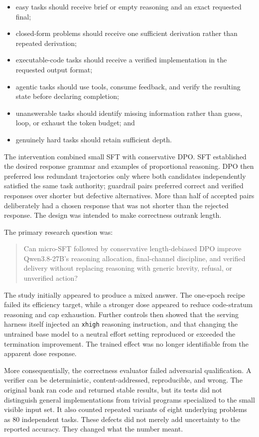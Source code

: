 \documentclass[
]{article}
\providecommand{\tightlist}{%
  \setlength{\itemsep}{0pt}\setlength{\parskip}{0pt}}
\begin{document}
\begin{itemize}
\tightlist
\item
  easy tasks should receive brief or empty reasoning and an exact
  requested final;
\item
  closed-form problems should receive one sufficient derivation rather
  than repeated derivation;
\item
  executable-code tasks should receive a verified implementation in the
  requested output format;
\item
  agentic tasks should use tools, consume feedback, and verify the
  resulting state before declaring completion;
\item
  unanswerable tasks should identify missing information rather than
  guess, loop, or exhaust the token budget; and
\item
  genuinely hard tasks should retain sufficient depth.
\end{itemize}

The intervention combined small SFT with conservative DPO. SFT
established the desired response grammar and examples of proportional
reasoning. DPO then preferred less redundant trajectories only where
both candidates independently satisfied the same task authority;
guardrail pairs preferred correct and verified responses over shorter
but defective alternatives. More than half of accepted pairs
deliberately had a chosen response that was not shorter than the
rejected response. The design was intended to make correctness outrank
length.

The primary research question was:

\begin{quote}
Can micro-SFT followed by conservative length-debiased DPO improve
Qwen3.8-27B's reasoning allocation, final-channel discipline, and
verified delivery without replacing reasoning with generic brevity,
refusal, or unverified action?
\end{quote}

The study initially appeared to produce a mixed answer. The one-epoch
recipe failed its efficiency target, while a stronger dose appeared to
reduce code-stratum reasoning and cap exhaustion. Further controls then
showed that the serving harness itself injected an \texttt{xhigh}
reasoning instruction, and that changing the untrained base model to a
neutral effort setting reproduced or exceeded the termination
improvement. The trained effect was no longer identifiable from the
apparent dose response.

More consequentially, the correctness evaluator failed adversarial
qualification. A verifier can be deterministic, content-addressed,
reproducible, and wrong. The original bank ran code and returned stable
results, but its tests did not distinguish general implementations from
trivial programs specialized to the small visible input set. It also
counted repeated variants of eight underlying problems as 80 independent
tasks. These defects did not merely add uncertainty to the reported
accuracy. They changed what the number meant.
\end{document}
